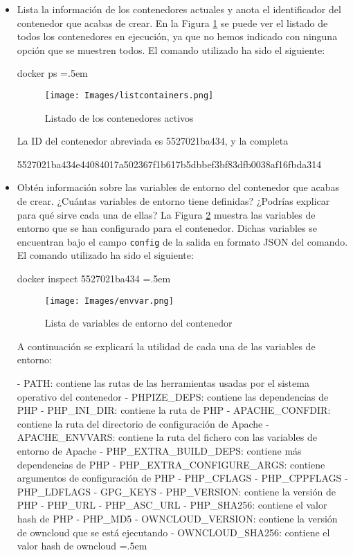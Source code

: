 \documentclass[12pt,a4paper]{article}
\newenvironment{lcverbatim}
 {\SaveVerbatim{cverb}}
 {\endSaveVerbatim
  \flushleft\fboxrule=0pt\fboxsep=.5em
  \colorbox{cverbbg}{%
    \makebox[\dimexpr\linewidth-2\fboxsep][l]{\BUseVerbatim{cverb}}%
  }
  \endflushleft
}
\begin{document}
\begin{itemize}
\item Lista la información de los contenedores actuales y anota el identificador del contenedor que
acabas de crear. En la Figura \ref{fig:listcontainers} se puede ver el listado de todos los contenedores en ejecución, ya que no hemos indicado con ninguna opción que se muestren todos. El comando utilizado ha sido el siguiente:

\begin{lcverbatim}
docker ps
\end{lcverbatim}


\begin{figure}[h]
    \centering
    \texttt{[image: Images/listcontainers.png]}
    \caption{Listado de los contenedores activos}
    \label{fig:listcontainers}
\end{figure}

La ID del contenedor abreviada es 5527021ba434, y la completa 

5527021ba434e44084017a502367f1b617b5dbbef3bf83dfb0038af16fbda314

\item Obtén información sobre las variables de entorno del contenedor que acabas de crear. ¿Cuántas variables de entorno tiene definidas? ¿Podrías explicar para qué sirve cada una de ellas? La Figura \ref{fig:envvar} muestra las variables de entorno que se han configurado para el contenedor. Dichas variables se encuentran bajo el campo \verb|config| de la salida en formato JSON del comando. El comando utilizado ha sido el siguiente:

\begin{lcverbatim}
docker inspect 5527021ba434
\end{lcverbatim}

\begin{figure}[h]
    \centering
    \texttt{[image: Images/envvar.png]}
    \caption{Lista de variables de entorno del contenedor}
    \label{fig:envvar}
\end{figure}

A continuación se explicará la utilidad de cada una de las variables de entorno:

\begin{lcverbatim}
- PATH: contiene las rutas de las herramientas usadas por el 
sistema operativo del contenedor
- PHPIZE_DEPS: contiene las dependencias de PHP
- PHP_INI_DIR: contiene la ruta de PHP
- APACHE_CONFDIR: contiene la ruta del directorio de configuración 
de Apache
- APACHE_ENVVARS: contiene la ruta del fichero con las variables de 
entorno de Apache
- PHP_EXTRA_BUILD_DEPS: contiene más dependencias de PHP
- PHP_EXTRA_CONFIGURE_ARGS: contiene argumentos de configuración de 
PHP
- PHP_CFLAGS
- PHP_CPPFLAGS
- PHP_LDFLAGS
- GPG_KEYS
- PHP_VERSION: contiene la versión de PHP
- PHP_URL
- PHP_ASC_URL
- PHP_SHA256: contiene el valor hash de PHP
- PHP_MD5
- OWNCLOUD_VERSION: contiene la versión de owncloud que se está 
ejecutando
- OWNCLOUD_SHA256: contiene el valor hash de owncloud
\end{lcverbatim}


\end{itemize}
\end{document}
